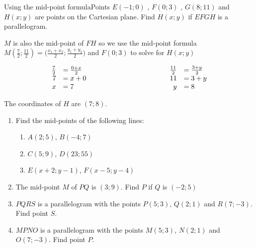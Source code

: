 \begin{wex}{Using the mid-point formula}{Points $E(-1;0)$ , $F(0;3)$ , $G(8;11)$ and $H(x;y)$ are points on the Cartesian plane. Find $H(x;y)$ if $EFGH$ is a parallelogram.}
{
$M$ is also the mid-point of $FH$ so we use the mid-point formula
$M(\frac{7}{2};\frac{11}{2}) = \Big(\frac{x_1+x_2}{2}; \frac{y_1+y_2}{2}\Big)$ and $F(0;3)$ to solve for $H(x;y)$

\begin{equation*}
\begin{array}{rllrl}
\frac{7}{2}&=\frac{0+x}{2}&\hskip10em&\frac{11}{2}&=\frac{3+y}{2}\\
7&=x+0&&11&=3+y\\
x&=7&&y&=8\\
\end{array}
\end{equation*}

The coordinates of $H$ are $(7;8)$.
}
\end{wex}


\begin{exercises}{}
{
\begin{enumerate}[itemsep=5pt, label=\textbf{\arabic*}. ]
\item Find the mid-points of the following lines:
    \begin{enumerate}[noitemsep, label=\textbf{(\alph*)} ]
    \item $A(2;5)$, $B(-4;7)$
    \item $C(5;9)$, $D(23;55)$
    \item $E(x+2;y-1)$, $F(x-5;y-4)$
    \end{enumerate}

\item The mid-point $M$ of $PQ$ is $(3;9)$. Find $P$ if $Q$ is $(-2;5)$

\item $PQRS$ is a parallelogram with the points $P(5;3)$, $Q(2;1)$ and $R(7;-3)$. Find point $S$.

\item $MPNO$ is a parallelogram with the points $M(5;3)$, $N(2;1)$ and $O(7;-3)$. Find point $P$.
\end{enumerate}

}
\end{exercises}    

